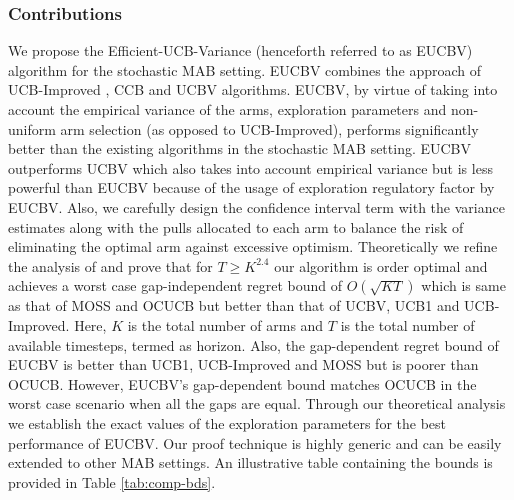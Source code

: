 \documentclass[MS,synopsis]{iitmdiss}
\begin{document}
\subsubsection{Contributions}

We propose the Efficient-UCB-Variance (henceforth referred to as EUCBV) algorithm for the stochastic MAB setting. EUCBV combines the approach of UCB-Improved \citep{auer2010ucb} , CCB \citep{liu2016modification} and UCBV \citep{audibert2009exploration} algorithms. EUCBV, by virtue of taking into account the empirical variance of the arms, exploration parameters  and non-uniform arm selection (as opposed to UCB-Improved), performs significantly better than the existing algorithms in the stochastic MAB setting. EUCBV outperforms UCBV which also takes into account empirical variance but is less powerful than EUCBV because of the usage of exploration regulatory factor by EUCBV. Also, we carefully design the confidence interval term with the variance estimates along with the pulls allocated to each arm to balance the risk of eliminating the optimal arm against excessive optimism. Theoretically we refine the analysis of \citet{auer2010ucb} and prove that for $T\geq K^{2.4}$ our algorithm is order optimal and achieves a worst case gap-independent regret bound of $O\left( \sqrt{KT} \right)$ which is same as that of MOSS \citep{audibert2009minimax} and OCUCB \citep{lattimore2015optimally} but better than that of UCBV, UCB1 \citep{auer2002finite} and UCB-Improved. Here, $K$ is the total number of arms and $T$ is the total number of available timesteps,  termed as horizon. Also, the gap-dependent regret bound of EUCBV is better than UCB1, UCB-Improved and MOSS but is poorer than OCUCB. However, EUCBV's gap-dependent bound matches OCUCB in the worst case scenario when all the gaps are equal. Through our theoretical analysis we establish the exact values of the exploration parameters for the best performance of EUCBV. Our proof technique is highly generic and can be easily extended to other MAB settings. An illustrative table containing the bounds is provided in Table \ref{tab:comp-bds}. 
\end{document}
